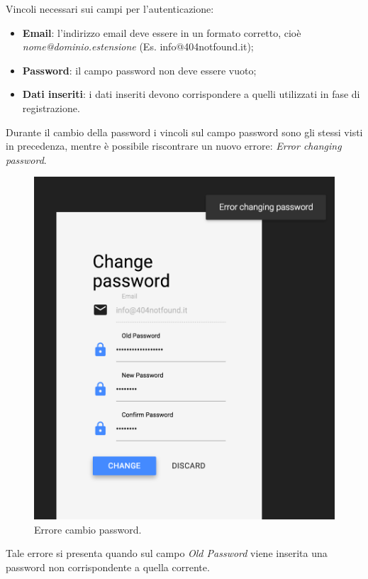 Vincoli necessari sui campi per l'autenticazione:
\begin{itemize}
\item \textbf{Email}: l'indirizzo email deve essere in un formato corretto, cioè \emph{nome@dominio.estensione} (Es. info@404notfound.it);
\item \textbf{Password}: il campo password non deve essere vuoto;
\item \textbf{Dati inseriti}: i dati inseriti devono corrispondere a quelli utilizzati in fase di registrazione.
\end{itemize}

Durante il cambio della password i vincoli sul campo password sono gli stessi visti in precedenza, mentre è possibile riscontrare un nuovo errore: \emph{Error changing password}.

\begin{figure}[!h]
\begin{center}
\includegraphics[scale=0.4]{img/change_pass_error.png}
\caption{Errore cambio password.}
\end{center}
\end{figure}

Tale errore si presenta quando sul campo \emph{Old Password} viene inserita una password non corrispondente a quella corrente.
